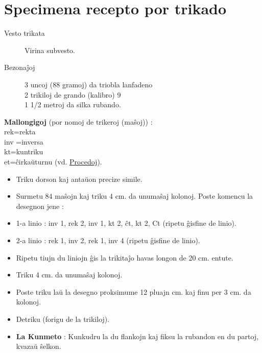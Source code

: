 \section[Specimena recepto por trikado]{Specimena recepto por trikado}
\hypertarget{Specimena recepto por trikado}{}
\label{Specimena recepto por trikado}


\begin{description}
\item[Vesto trikata]

 Virina subvesto.

\item[Bezonaĵoj]

 3 uncoj (88 gramoj) da triobla lanfadeno\\
2 trikiloj de grando (kalibro) 9\\
1 1\slash 2 metroj da silka rubando.
\end{description}

\begin{center} \textbf{Mallongigoj} (por nomoj de trikeroj (maŝoj)) :\\
rek=rekta\\
inv =inversa\\
kt=kuntriku\\
et=ĉirkaŭturnu (vd. \hyperlink{Procedoj}{Procedoj}).\end{center}

\begin{itemize}
\item Triku dorson kaj antaŭon precize simile.

\item Surmetu 84 maŝojn kaj triku 4 cm. da unumaŝaj kolonoj. Poste komencu la desegnon jene :

\item 1-a linio : inv 1, rek 2, inv 1, kt 2, ĉt, kt 2, Ct (ripetu ĝisfine de linio).

\item 2-a linio : rek 1, inv 2, rek 1, inv 4 (ripetu ĝisfine de linio).

\item Ripetu tiujn du liniojn ĝis la trikitaĵo havas longon de 20 cm. entute.

\item Triku 4 cm. da unumaŝaj kolonoj.

\item Poste triku laŭ la desegno proksimume 12 pluajn cm. kaj finu per 3 cm. da kolonoj.

\item Detriku (forigu de la trikiloj).

\item \textbf{La Kunmeto} : Kunkudru la du flankojn kaj fiksu la rubandon en du partoj, kvazaŭ ŝelkon.

\end{itemize}

